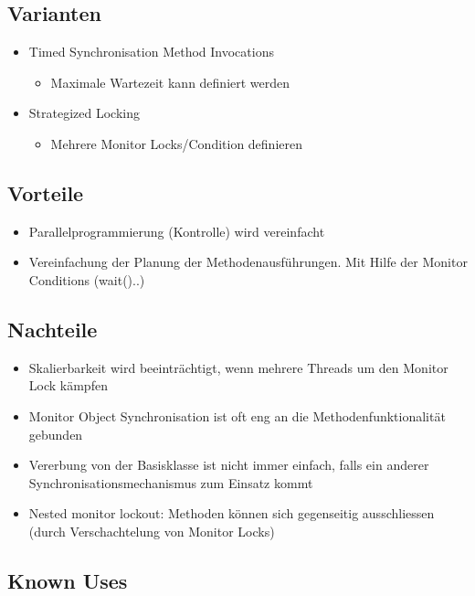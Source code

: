 \subsection{Varianten}

\begin{itemize}
	\item Timed Synchronisation Method Invocations
	\begin{itemize}
		\item Maximale Wartezeit kann definiert werden
	\end{itemize}
	\item Strategized Locking
	\begin{itemize}
		\item Mehrere Monitor Locks/Condition definieren
	\end{itemize}
\end{itemize}

\subsection{Vorteile}


\begin{itemize}
	\item Parallelprogrammierung (Kontrolle) wird vereinfacht
	\item Vereinfachung der Planung der Methodenausführungen. Mit Hilfe der Monitor Conditions (wait()..)
\end{itemize}

\subsection{Nachteile}


\begin{itemize}
	\item Skalierbarkeit wird beeinträchtigt, wenn mehrere Threads um den Monitor Lock kämpfen
	\item Monitor Object Synchronisation ist oft eng an die Methodenfunktionalität gebunden
	\item Vererbung von der Basisklasse ist nicht immer einfach, falls ein anderer Synchronisationsmechanismus zum Einsatz kommt
	\item Nested monitor lockout: Methoden können sich gegenseitig ausschliessen (durch Verschachtelung von Monitor Locks)
\end{itemize}

\subsection{Known Uses}


